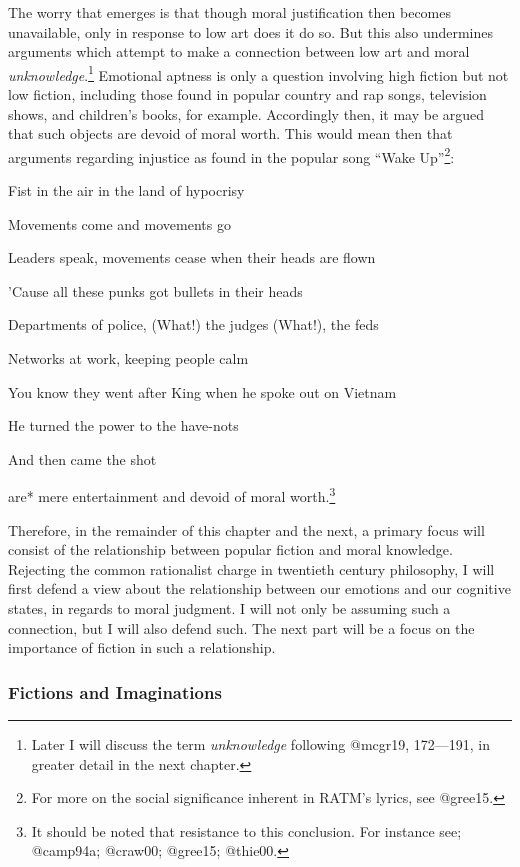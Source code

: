 \documentclass[
  letterpaper,
  DIV=11,
  numbers=noendperiod]{scrartcl}
\theoremstyle{remark}
\begin{document}
The worry that emerges is that though moral justification then becomes
unavailable, only in response to low art does it do so. But this also
undermines arguments which attempt to make a connection between low art
and moral \emph{unknowledge}.\footnote{Later I will discuss the term
  \emph{unknowledge} following @mcgr19, 172---191, in greater detail in
  the next chapter.} Emotional aptness is only a question involving high
fiction but not low fiction, including those found in popular country
and rap songs, television shows, and children's books, for example.
Accordingly then, it may be argued that such objects are devoid of moral
worth. This would mean then that arguments regarding injustice as found
in the popular song ``Wake Up''\footnote{For more on the social
  significance inherent in RATM's lyrics, see @gree15.}:

Fist in the air in the land of hypocrisy

Movements come and movements go

Leaders speak, movements cease when their heads are flown

'Cause all these punks got bullets in their heads

Departments of police, (What!) the judges (What!), the feds

Networks at work, keeping people calm

You know they went after King when he spoke out on Vietnam

He turned the power to the have-nots

And then came the shot

\noindent *are* mere entertainment and devoid of moral worth.\footnote{It
  should be noted that resistance to this conclusion. For instance see;
  @camp94a; @craw00; @gree15; @thie00.}

Therefore, in the remainder of this chapter and the next, a primary
focus will consist of the relationship between popular fiction and moral
knowledge. Rejecting the common rationalist charge in twentieth century
philosophy, I will first defend a view about the relationship between
our emotions and our cognitive states, in regards to moral judgment. I
will not only be assuming such a connection, but I will also defend
such. The next part will be a focus on the importance of fiction in such
a relationship.

\subsubsection*{Fictions and
Imaginations}\label{fictions-and-imaginations}
\end{document}
